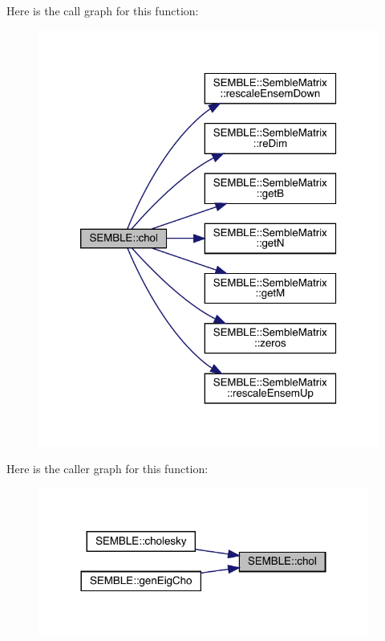 Here is the call graph for this function\+:
\nopagebreak
\begin{figure}[H]
\begin{center}
\leavevmode
\includegraphics[width=320pt]{d7/dfd/namespaceSEMBLE_af183367741f8d2609dd572702f7b4347_cgraph}
\end{center}
\end{figure}
Here is the caller graph for this function\+:
\nopagebreak
\begin{figure}[H]
\begin{center}
\leavevmode
\includegraphics[width=308pt]{d7/dfd/namespaceSEMBLE_af183367741f8d2609dd572702f7b4347_icgraph}
\end{center}
\end{figure}
\mbox{\label{namespaceSEMBLE_affb96647c0e0a2b292f51ad740e92d78}} 
